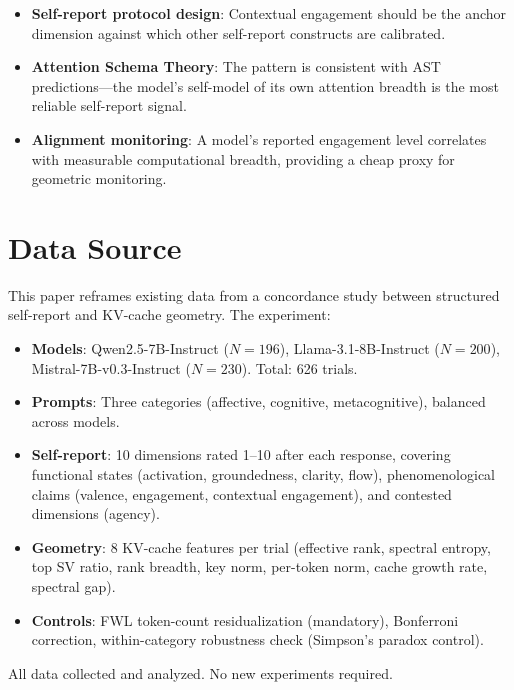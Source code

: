 \documentclass[11pt,letterpaper]{article}
\begin{document}
\begin{itemize}[nosep]
    \item \textbf{Self-report protocol design}: Contextual engagement should be the anchor dimension against which other self-report constructs are calibrated.
    \item \textbf{Attention Schema Theory}: The pattern is consistent with AST predictions---the model's self-model of its own attention breadth is the most reliable self-report signal.
    \item \textbf{Alignment monitoring}: A model's reported engagement level correlates with measurable computational breadth, providing a cheap proxy for geometric monitoring.
\end{itemize}

\section{Data Source}

This paper reframes existing data from a concordance study between structured self-report and KV-cache geometry. The experiment:

\begin{itemize}[nosep]
    \item \textbf{Models}: Qwen2.5-7B-Instruct ($N = 196$), Llama-3.1-8B-Instruct ($N = 200$), Mistral-7B-v0.3-Instruct ($N = 230$). Total: 626 trials.
    \item \textbf{Prompts}: Three categories (affective, cognitive, metacognitive), balanced across models.
    \item \textbf{Self-report}: 10 dimensions rated 1--10 after each response, covering functional states (activation, groundedness, clarity, flow), phenomenological claims (valence, engagement, contextual engagement), and contested dimensions (agency).
    \item \textbf{Geometry}: 8 KV-cache features per trial (effective rank, spectral entropy, top SV ratio, rank breadth, key norm, per-token norm, cache growth rate, spectral gap).
    \item \textbf{Controls}: FWL token-count residualization (mandatory), Bonferroni correction, within-category robustness check (Simpson's paradox control).
\end{itemize}

All data collected and analyzed. No new experiments required.
\end{document}
